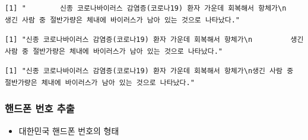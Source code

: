 \documentclass[
  11pt,
]{krantz}
\newenvironment{Shaded}{\begin{snugshade}}{\end{snugshade}}
\newcommand{\CommentTok}[1]{\textcolor[rgb]{0.37,0.37,0.37}{\textit{#1}}}
\newcommand{\FunctionTok}[1]{\textcolor[rgb]{0,0,0}{#1}}
\newcommand{\NormalTok}[1]{#1}
\newcommand{\SpecialCharTok}[1]{\textcolor[rgb]{0,0,0}{#1}}
\newcommand{\StringTok}[1]{\textcolor[rgb]{0.5,0.5,0.5}{#1}}
\providecommand{\tightlist}{%
  \setlength{\itemsep}{0pt}\setlength{\parskip}{0pt}}
\begin{document}
\begin{verbatim}
[1] "        신종 코로나바이러스 감염증(코로나19) 환자 가운데 회복해서 항체가\n         생긴 사람 중 절반가량은 체내에 바이러스가 남아 있는 것으로 나타났다."
\end{verbatim}

\begin{Shaded}
\end{Shaded}

\begin{verbatim}
[1] "신종 코로나바이러스 감염증(코로나19) 환자 가운데 회복해서 항체가\n         생긴 사람 중 절반가량은 체내에 바이러스가 남아 있는 것으로 나타났다."
\end{verbatim}

\begin{Shaded}
\end{Shaded}

\begin{verbatim}
[1] "신종 코로나바이러스 감염증(코로나19) 환자 가운데 회복해서 항체가\n생긴 사람 중 절반가량은 체내에 바이러스가 남아 있는 것으로 나타났다."
\end{verbatim}

\normalsize

\hypertarget{regex-cellphone}{%
\subsubsection*{\texorpdfstring{\textbf{핸드폰 번호 추출}}{핸드폰 번호 추출}}\label{regex-cellphone}}


\begin{itemize}
\tightlist
\item
  대한민국 핸드폰 번호의 형태
\end{itemize}
\end{document}
